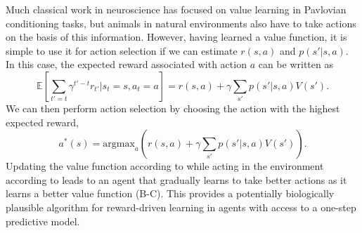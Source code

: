 Much classical work in neuroscience has focused on value learning in Pavlovian conditioning tasks, but animals in natural environments also have to take actions on the basis of this information.
However, having learned a value function, it is simple to use it for action selection if we can estimate $r(s, a)$ and $p(s' | s, a)$.
In this case, the expected reward associated with action $a$ can be written as
\begin{equation}
    \mathbb{E} \left [\sum_{t' = t} \gamma^{t'-t} r_{t'} | s_t = s, a_t = a \right ] = r(s, a) + \gamma \sum_{s'} p( s' | s, a) V(s').
\end{equation}
We can then perform action selection by choosing the action with the highest expected reward,
\begin{equation}
    \label{eq:value_action_selection}
    a^*(s) = \text{argmax}_{a} \left ( r(s, a) + \gamma \sum_{s'} p(s' | s, a) V(s') \right ).
\end{equation}
Updating the value function according to  while acting in the environment according to  leads to an agent that gradually learns to take better actions as it learns a better value function (B-C).
This provides a potentially biologically plausible algorithm for reward-driven learning in agents with access to a one-step predictive model.

